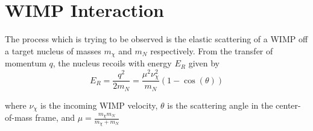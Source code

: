 \section{WIMP Interaction} \label{wimp_theory}

\par
The process which is trying to be observed is the elastic scattering of a WIMP off a target nucleus of masses $m_{\chi}$ and $m_{N}$ respectively.
From the transfer of momentum $q$, the nucleus recoils with energy $E_{R}$ given by
\begin{equation}
    E_{R} = \frac{q^{2}}{2m_{N}} = \frac{\mu^2\nu_{\chi}^2}{m_{N}}(1-\cos(\theta))
\end{equation}

where $\nu_{\chi}$ is the incoming WIMP velocity, $\theta$ is the scattering angle in the center-of-mass frame, and $\mu=\frac{m_{\chi}m_{N}}{m_{\chi} + m_{N}}$